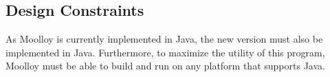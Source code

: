 \documentclass[11pt]{article}
\theoremstyle{definition}
\begin{document}
\subsection{Design Constraints}\label{sec:constraints}

As Moolloy is currently implemented in Java, the new version must also
be implemented in Java. Furthermore, to maximize the utility of this
program, Moolloy must be able to build and run on any platform that
supports Java.



\printbibliography[heading=bibintoc]
\end{document}
